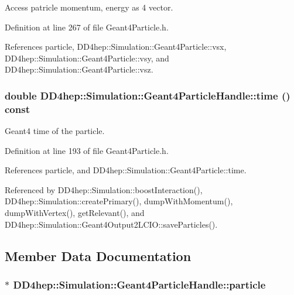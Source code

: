 Access patricle momentum, energy as 4 vector. 

Definition at line 267 of file Geant4Particle.h.

References particle, DD4hep::Simulation::Geant4Particle::vsx, DD4hep::Simulation::Geant4Particle::vsy, and DD4hep::Simulation::Geant4Particle::vsz.\hypertarget{class_d_d4hep_1_1_simulation_1_1_geant4_particle_handle_a014d5ea77dd47e536e99926c39aa79c6}{
\subsubsection[{time}]{\setlength{\rightskip}{0pt plus 5cm}double DD4hep::Simulation::Geant4ParticleHandle::time () const}}
\label{class_d_d4hep_1_1_simulation_1_1_geant4_particle_handle_a014d5ea77dd47e536e99926c39aa79c6}


Geant4 time of the particle. 

Definition at line 193 of file Geant4Particle.h.

References particle, and DD4hep::Simulation::Geant4Particle::time.

Referenced by DD4hep::Simulation::boostInteraction(), DD4hep::Simulation::createPrimary(), dumpWithMomentum(), dumpWithVertex(), getRelevant(), and DD4hep::Simulation::Geant4Output2LCIO::saveParticles().

\subsection{Member Data Documentation}
\hypertarget{class_d_d4hep_1_1_simulation_1_1_geant4_particle_handle_ad7a732832f8fe7f74c8fdb4cff5baced}{
\subsubsection[{particle}]{$\ast$ {\bf DD4hep::Simulation::Geant4ParticleHandle::particle}}}
\label{class_d_d4hep_1_1_simulation_1_1_geant4_particle_handle_ad7a732832f8fe7f74c8fdb4cff5baced}



